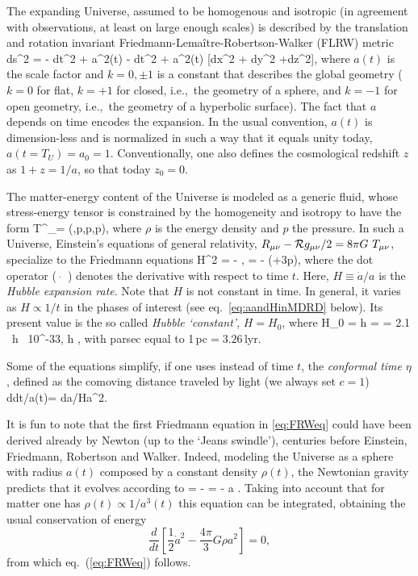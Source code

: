 The expanding Universe, assumed to be homogenous and isotropic (in agreement with observations, at least on large enough scales) is described by the translation and rotation invariant Friedmann-Lema\^itre-Robertson-Walker (FLRW) metric 
\beq 
ds^2 = - dt^2 + a^2(t)  - dt^2 + a^2(t) [dx^2 + dy^2 +dz^2],
\eeq
where $a(t)$ is the scale factor and $k = 0, \pm1$ is a constant that describes the global geometry ($k=0$ for flat, $k=+1$ for closed, i.e.,~the geometry of a sphere, and $k=-1$ for open geometry, i.e.,~the geometry of a hyperbolic surface). The fact that $a$ depends on time encodes the expansion. In the usual convention, $a(t)$ is dimension-less and is normalized in such a way that it equals unity today, $a( t = T_U) = a_0 = 1$. Conventionally, one also defines the cosmological redshift $z$ as $1+z = 1/a$, so that today $z_0 = 0$.

\medskip

The matter-energy content of the Universe is modeled as a generic fluid, whose stress-energy tensor is constrained by the homogeneity and isotropy to have the form
\beq 
T^\mu_\nu = \diag(\rho,p,p,p),
\eeq
where $\rho$ is the energy density and $p$ the pressure. 
In such a Universe, Einstein's equations of general relativity,
$R_{\mu\nu} - {\cal R}g_{\mu\nu}/2= 8\pi G~ T_{\mu\nu} $,
specialize to the Friedmann equations
\beq
\label{eq:FRWeq}
\displaystyle H^2 = \rho - , \qquad
\displaystyle {} = - (\rho+3p),
\eeq
where the dot operator (~$\dot{}$~) denotes the derivative with respect to time $t$. Here, $H\equiv \dot a/a$ is the {\em Hubble expansion rate}. Note that $H$ is not constant in time.  In general, it varies as $H\propto 1/t$ in the phases of interest (see eq.~\eqref{eq:aandHinMDRD} below). Its present value is the so called {\em Hubble `constant'}, $H=H_0$, where
\beq 
H_0 = h  = 
 = 2.1 \, h~ 10^{-33}\eV,\qquad
h ,
\eeq
with parsec equal to 1\,pc$=3.26$\,lyr. 

Some of the equations simplify, if one uses instead of time $t$, the {\em conformal time}
$\eta$, defined as the comoving distance traveled by light (we always set $c=1$)
\beq
d\eta \equiv  dt/a(t)= da/Ha^2.
\eeq

\medskip

It is fun to note that the first Friedmann equation in \eqref{eq:FRWeq} could have been derived already 
by Newton (up to the `Jeans swindle'), centuries before Einstein, Friedmann, Robertson and Walker. 
Indeed, modeling the Universe as a sphere with radius $a(t)$ composed by a constant density $\rho(t)$, the Newtonian gravity
predicts that it evolves according to  
\beq {}= - =
- a .\eeq
Taking into account that for matter one has $\rho(t)\propto 1/a^3(t)$
this equation can be integrated,  obtaining the usual conservation of energy
$$ \frac{d}{dt}\left[ \frac{1}{2}\dot{a}^2-\frac{4\pi}{3}G\rho a^2\right]=0,$$
from which eq.~(\ref{eq:FRWeq}) follows.

